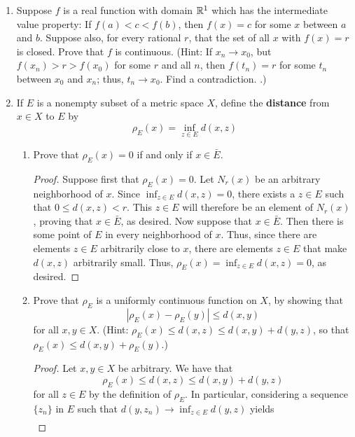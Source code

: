 \documentclass[../psets.tex]{subfiles}
\begin{document}
\begin{enumerate}[label={\textbf{\arabic*.}}]
    \item Suppose $f$ is a real function with domain $\mathbb{R}^1$ which has the intermediate value property: If $f(a)<c<f(b)$, then $f(x)=c$ for some $x$ between $a$ and $b$. Suppose also, for every rational $r$, that the set of all $x$ with $f(x)=r$ is closed. Prove that $f$ is continuous. (Hint: If $x_n\to x_0$, but $f(x_n)>r>f(x_0)$ for some $r$ and all $n$, then $f(t_n)=r$ for some $t_n$ between $x_0$ and $x_n$; thus, $t_n\to x_0$. Find a contradiction. \parencite{bib:Fine}.)
    \item If $E$ is a nonempty subset of a metric space $X$, define the \textbf{distance} from $x\in X$ to $E$ by
    \begin{equation*}
        \rho_E(x) = \inf_{z\in E}d(x,z)
    \end{equation*}
    \begin{enumerate}
        \item Prove that $\rho_E(x)=0$ if and only if $x\in\bar{E}$.
        \begin{proof}
            Suppose first that $\rho_E(x)=0$. Let $N_r(x)$ be an arbitrary neighborhood of $x$. Since $\inf_{z\in E}d(x,z)=0$, there exists a $z\in E$ such that $0\leq d(x,z)<r$. This $z\in E$ will therefore be an element of $N_r(x)$, proving that $x\in\bar{E}$, as desired.
            Now suppose that $x\in\bar{E}$. Then there is some point of $E$ in every neighborhood of $x$. Thus, since there are elements $z\in E$ arbitrarily close to $x$, there are elements $z\in E$ that make $d(x,z)$ arbitrarily small. Thus, $\rho_E(x)=\inf_{z\in E}d(x,z)=0$, as desired.
        \end{proof}
        \item Prove that $\rho_E$ is a uniformly continuous function on $X$, by showing that
        \begin{equation*}
            |\rho_E(x)-\rho_E(y)| \leq d(x,y)
        \end{equation*}
        for all $x,y\in X$. (Hint: $\rho_E(x)\leq d(x,z)\leq d(x,y)+d(y,z)$, so that $\rho_E(x)\leq d(x,y)+\rho_E(y)$.)
        \begin{proof}
            Let $x,y\in X$ be arbitrary. We have that
            \begin{equation*}
                \rho_E(x) \leq d(x,z) \leq d(x,y)+d(y,z)
            \end{equation*}
            for all $z\in E$ by the definition of $\rho_E$. In particular, considering a sequence $\{z_n\}$ in $E$ such that $d(y,z_n)\to\inf_{z\in E}d(y,z)$ yields
            \begin{align*}

\end{align*}
\end{proof}
\end{enumerate}
\end{enumerate}
\end{document}
